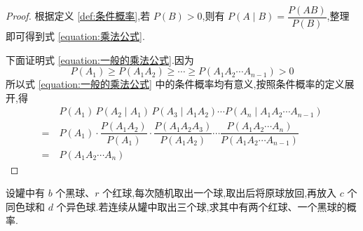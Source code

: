 \begin{proof}
    根据定义 \ref{def:条件概率},若 $P(B)>0$,则有 $P(A \mid B) = \dfrac{P(AB)}{P(B)}$,整理即可得到式 \eqref{equation:乘法公式}.

    下面证明式 \eqref{equation:一般的乘法公式}.因为
    $$
    P(A_1) \geqslant P(A_1 A_2) \geqslant \cdots \geqslant P(A_1 A_2 \cdots A_{n-1}) > 0
    $$
    所以式 \eqref{equation:一般的乘法公式} 中的条件概率均有意义,按照条件概率的定义展开,得
    $$
    \begin{aligned}
        & P(A_1) \, P(A_2 \mid A_1) \, P(A_3 \mid A_1 A_2) \cdots P(A_n \mid A_1 A_2 \cdots A_{n-1}) \\
        =\ & P(A_1) \cdot \dfrac{P(A_1 A_2)}{P(A_1)} \cdot \dfrac{P(A_1 A_2 A_3)}{P(A_1 A_2)} \cdots \dfrac{P(A_1 A_2 \cdots A_n)}{P(A_1 A_2 \cdots A_{n-1})} \\
        =\ & P(A_1 A_2 \cdots A_n)
    \end{aligned}
    $$

    \vspace{-2em}
\end{proof}

\begin{example}[][波利亚罐子模型]
    \indent 设罐中有 $b$ 个黑球、$r$ 个红球,每次随机取出一个球,取出后将原球放回,再放入 $c$ 个同色球和 $d$ 个异色球.若连续从罐中取出三个球,求其中有两个红球、一个黑球的概率.
\end{example}

